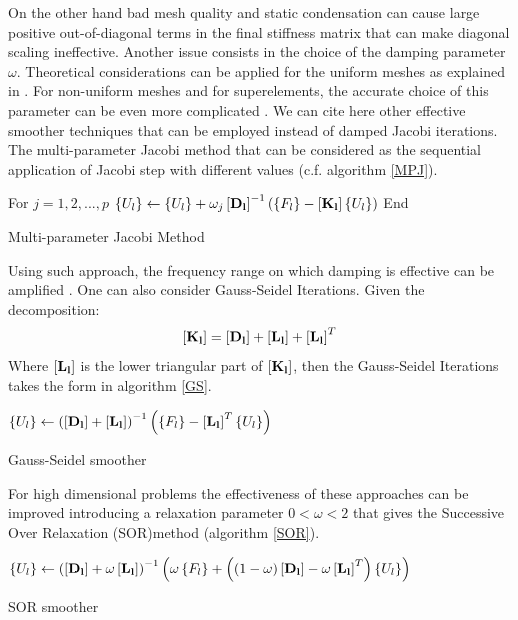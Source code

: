    On the other hand bad mesh quality and static condensation can cause large positive out-of-diagonal terms in the final stiffness matrix that can make diagonal scaling ineffective. Another issue consists in the choice of the damping parameter $\omega$. Theoretical considerations can be applied for the uniform meshes as explained in \cite{saad2003iterative}. For non-uniform meshes and for superelements, the accurate choice of this parameter can be even more complicated \cite{bin2010geometric}.
   We can cite here other effective smoother techniques that can be employed instead of damped Jacobi iterations.
   The  multi-parameter Jacobi method that can be considered as the sequential application of Jacobi step with different values (c.f. algorithm \ref{MPJ}).
     \begin{algorithm}
     For $j=1,2,...,p$\;
    $\left\lbrace{U_{l}}\right \rbrace\gets\left\lbrace{U_{l}}\right \rbrace+\omega_j\left[{\mathbf{D_{l}}}\right]^{-1}\left(\left\lbrace{F_{l}}\right \rbrace-\left[{\mathbf{K_{l}}}\right]\left\lbrace{U_{l}}\right \rbrace\right)$\;
    End\;
    \caption{Multi-parameter Jacobi Method \label{MPJ}}
     \end{algorithm}
  Using such approach, the frequency range on which damping is effective can be amplified \cite{bin2009efficient}.
  One can also consider Gauss-Seidel Iterations. Given the decomposition:
  \begin{equation}
  \left[{\mathbf{K_{l}}}\right]=\left[{\mathbf{D_{l}}}\right]+\left[{\mathbf{L_{l}}}\right]+\left[{\mathbf{L_{l}}}\right]^T
  \end{equation}
  Where $\left[{\mathbf{L_{l}}}\right]$ is the lower triangular part of $\left[{\mathbf{K_{l}}}\right]$, then the Gauss-Seidel Iterations takes the form in algorithm \ref{GS}.
\begin{algorithm} 
       $\left\lbrace{U_{l}}\right \rbrace\gets\left(\left[{\mathbf{D_{l}}}\right]+\left[{\mathbf{L_{l}}}\right]\right)^{-1}\left(\left\lbrace{F_{l}}\right \rbrace-\left[{\mathbf{L_{l}}}\right]^T\left\lbrace{U_{l}}\right \rbrace\right)$\;
       \caption{Gauss-Seidel smoother\label{GS}}
\end{algorithm}
For high dimensional problems the effectiveness of these approaches can be improved introducing a relaxation parameter $0<\omega<2$ that gives the Successive Over Relaxation (SOR)method (algorithm \ref{SOR}).
 \begin{algorithm} 
        $\left\lbrace{U_{l}}\right \rbrace\gets\left(\left[{\mathbf{D_{l}}}\right]+\omega\left[{\mathbf{L_{l}}}\right]\right)^{-1}\left(\omega\left\lbrace{F_{l}}\right \rbrace+\left((1-\omega)\left[{\mathbf{D_{l}}}\right]-\omega\left[{\mathbf{L_{l}}}\right]^T\right)\left\lbrace{U_{l}}\right \rbrace\right)$\;
        \caption{SOR smoother\label{SOR}}
 \end{algorithm}
